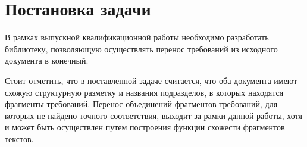 \section{Постановка задачи}
\label{sec:Chapter2} 
В рамках выпускной квалификационной работы необходимо разработать библиотеку, позволяющую осуществлять перенос требований из исходного документа в конечный.

Стоит отметить, что в поставленной задаче считается, что оба документа имеют схожую структурную разметку и названия подразделов, в которых находятся фрагменты требований. Перенос объединений фрагментов требований, для которых не найдено точного соответствия, выходит за рамки данной работы, хотя и может быть осуществлен путем построения функции схожести фрагментов текстов.
